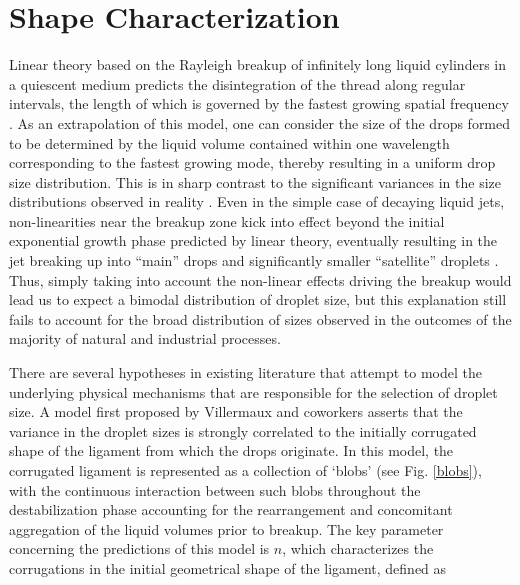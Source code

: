\section{Shape Characterization}

Linear theory based on the Rayleigh breakup of infinitely
long liquid cylinders in a quiescent medium predicts the disintegration
of the thread along regular intervals, the length of which is governed
by the fastest growing spatial frequency \cite{rayleigh1879a,rayleigh1879b}. 
As an extrapolation of this model, one can consider the size of the drops formed 
to be determined by the liquid volume contained within one wavelength corresponding 
to the fastest growing mode, thereby resulting in a uniform drop size distribution. 
This is in sharp contrast to the significant variances in the size distributions
observed in reality .  
Even in the simple case of decaying liquid jets, 
non-linearities near the breakup zone kick into effect beyond
the initial exponential growth phase predicted by linear theory, 
eventually resulting in the jet breaking up into 
``main'' drops and significantly smaller ``satellite'' droplets \cite{rutland1971non}.
Thus, simply taking into account the non-linear effects driving the breakup would
lead us to expect a bimodal distribution of droplet size, but this explanation 
still fails to account for the broad distribution of sizes observed in 
the outcomes of the majority of natural \cite{nature} and industrial \cite{industrial} processes. 


There are several hypotheses in existing literature  
that attempt to model the underlying physical mechanisms 
that are responsible for the selection of droplet size. 
A model first proposed by Villermaux and coworkers 
asserts that the variance in the droplet sizes is strongly 
correlated to the initially corrugated shape of the 
ligament from which the drops originate. 
In this model, the corrugated ligament is represented as a collection 
of `blobs' (see Fig. \ref{blobs}), with the continuous interaction between 
such blobs throughout the destabilization phase accounting for the 
rearrangement and concomitant aggregation of the liquid volumes prior to breakup. 
The key parameter concerning the predictions of this model 
is $n$, which characterizes the corrugations in the initial 
geometrical shape of the ligament, defined as  

